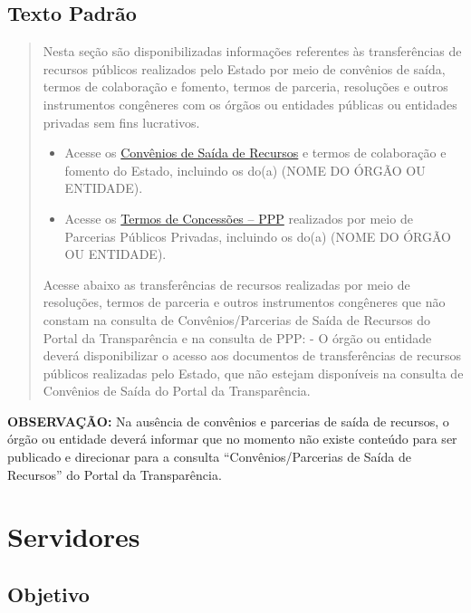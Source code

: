 \documentclass[]{book}
\begin{document}
\hypertarget{texto-padruxe3o-7}{%
\subsection{Texto Padrão}\label{texto-padruxe3o-7}}

\begin{quote}
Nesta seção são disponibilizadas informações referentes às transferências de recursos públicos realizados pelo Estado por meio de convênios de saída, termos de colaboração e fomento, termos de parceria, resoluções e outros instrumentos congêneres com os órgãos ou entidades públicas ou entidades privadas sem fins lucrativos.

\begin{itemize}
\item
  Acesse os \href{http://www.transparencia.mg.gov.br/convenios/convenios-de-saida}{Convênios de Saída de Recursos} e termos de colaboração e fomento do Estado, incluindo os do(a) (NOME DO ÓRGÃO OU ENTIDADE).
\item
  Acesse os \href{http://www.ppp.mg.gov.br/}{Termos de Concessões -- PPP} realizados por meio de Parcerias Públicos Privadas, incluindo os do(a) (NOME DO ÓRGÃO OU ENTIDADE).
\end{itemize}

Acesse abaixo as transferências de recursos realizadas por meio de resoluções, termos de parceria e outros instrumentos congêneres que não constam na consulta de Convênios/Parcerias de Saída de Recursos do Portal da Transparência e na consulta de PPP:
- O órgão ou entidade deverá disponibilizar o acesso aos documentos de transferências de recursos públicos realizadas pelo Estado, que não estejam disponíveis na consulta de Convênios de Saída do Portal da Transparência.
\end{quote}

\textbf{OBSERVAÇÃO:} Na ausência de convênios e parcerias de saída de recursos, o órgão ou entidade deverá informar que no momento não existe conteúdo para ser publicado e direcionar para a consulta ``Convênios/Parcerias de Saída de Recursos'' do Portal da Transparência.

\hypertarget{servidores}{%
\section{Servidores}\label{servidores}}

\hypertarget{objetivo-7}{%
\subsection{Objetivo}\label{objetivo-7}}
\end{document}
